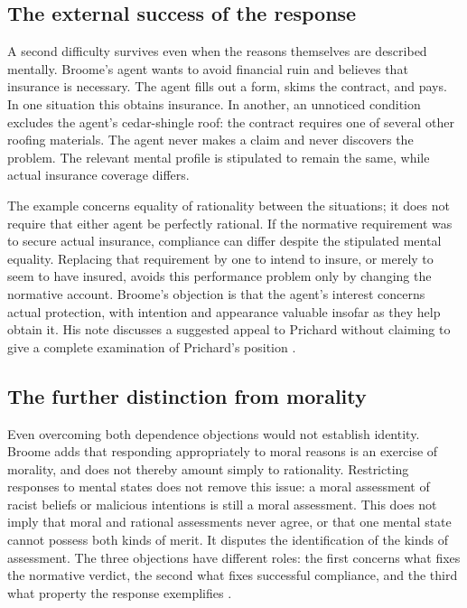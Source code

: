 \subsection{The external success of the response}

A second difficulty survives even when the reasons themselves are described
mentally. Broome's agent wants to avoid financial ruin and believes that
insurance is necessary. The agent fills out a form, skims the contract, and
pays. In one situation this obtains insurance. In another, an unnoticed
condition excludes the agent's cedar-shingle roof: the contract requires
one of several other roofing materials. The agent never makes a claim and
never discovers the problem. The relevant mental profile is stipulated to
remain the same, while actual insurance coverage differs.

The example concerns equality of rationality between the situations; it
does not require that either agent be perfectly rational. If the normative
requirement was to secure actual insurance, compliance can differ despite the
stipulated mental equality. Replacing that requirement by one to intend to
insure, or merely to seem to have insured, avoids this performance problem
only by changing the normative account. Broome's objection is that the
agent's interest concerns actual protection, with intention and appearance
valuable insofar as they help obtain it. His note discusses a suggested
appeal to Prichard without claiming to give a complete examination of
Prichard's position
\parencite[p.~132 and p.~135, n.~10]{Broome2021ReasonsRationality}.

\subsection{The further distinction from morality}

Even overcoming both dependence objections would not establish identity.
Broome adds that responding appropriately to moral reasons is an exercise
of morality, and does not thereby amount simply to rationality. Restricting
responses to mental states does not remove this issue: a moral assessment of
racist beliefs or malicious intentions is still a moral assessment. This
does not imply that moral and rational assessments never agree, or that one
mental state cannot possess both kinds of merit. It disputes the identification
of the kinds of assessment. The three objections have different roles:
the first concerns what fixes the normative verdict, the second what fixes
successful compliance, and the third what property the response exemplifies
\parencite[pp.~132--133]{Broome2021ReasonsRationality}.

